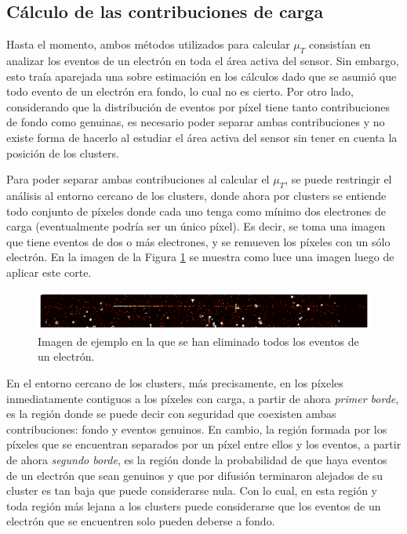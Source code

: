 \subsection{Cálculo de las contribuciones de carga}
\noindent Hasta el momento, ambos métodos utilizados para calcular $\mu_{T}$ consistían en analizar los eventos de un electrón en toda el área activa del sensor. Sin embargo, esto traía aparejada una sobre estimación en los cálculos dado que se asumió que todo evento de un electrón era fondo, lo cual no es cierto. Por otro lado, considerando que la distribución de eventos por píxel tiene tanto contribuciones de fondo como genuinas, es necesario poder separar ambas contribuciones y no existe forma de hacerlo al estudiar el área activa del sensor sin tener en cuenta la posición de los clusters.

Para poder separar ambas contribuciones al calcular el $\mu_{T}$, se puede restringir el análisis al entorno cercano de los clusters, donde ahora por clusters se entiende todo conjunto de píxeles donde cada uno tenga como mínimo dos electrones de carga (eventualmente podría ser un único píxel). Es decir, se toma una imagen que tiene eventos de dos o más electrones, y se remueven los píxeles con un sólo electrón. 
En la imagen de la Figura \ref{fig:ImagenFits2omasElectrones} se muestra como luce una imagen luego de aplicar este corte.
\begin{figure}[h]
    \centering
    \includegraphics[scale=0.4]{Figs/imagen_fits_2_o_mas.pdf}
    \caption{Imagen de ejemplo en la que se han eliminado todos los eventos de un electrón.}
    \label{fig:ImagenFits2omasElectrones}
\end{figure}
En el entorno cercano de los clusters, más precisamente, en los píxeles inmediatamente contiguos a los píxeles con carga, a partir de ahora  \textit{primer borde}, es la región donde se puede decir con seguridad que coexisten ambas contribuciones: fondo y eventos genuinos. En cambio, la región formada por los píxeles que se encuentran separados por un píxel entre ellos y los eventos, a partir de ahora \textit{segundo borde}, es la región donde la probabilidad de que haya eventos de un electrón que sean genuinos y que por difusión terminaron alejados de su cluster es tan baja que puede considerarse nula. 
Con lo cual, en esta región y toda región más lejana a los clusters puede considerarse que los eventos de un electrón que se encuentren solo pueden deberse a fondo.

